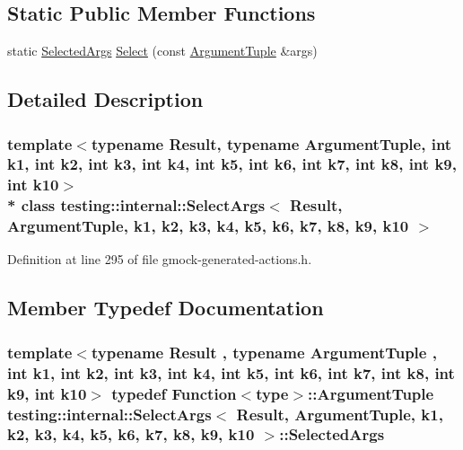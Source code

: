 \subsection*{Static Public Member Functions}
\begin{DoxyCompactItemize}
\item 
static \hyperlink{classtesting_1_1internal_1_1_select_args_ad1eaa794653b3f4cefdb5c2285b418a7}{Selected\+Args} \hyperlink{classtesting_1_1internal_1_1_select_args_a372c597a96263b29d59fdb08183bc2e1}{Select} (const \hyperlink{typedefs__d_8js_a396b2bdc7ef45f482a7e9254b15c3c01}{Argument\+Tuple} \&args)
\end{DoxyCompactItemize}


\subsection{Detailed Description}
\subsubsection*{template$<$typename Result, typename Argument\+Tuple, int k1, int k2, int k3, int k4, int k5, int k6, int k7, int k8, int k9, int k10$>$\\*
class testing\+::internal\+::\+Select\+Args$<$ Result, Argument\+Tuple, k1, k2, k3, k4, k5, k6, k7, k8, k9, k10 $>$}



Definition at line 295 of file gmock-\/generated-\/actions.\+h.



\subsection{Member Typedef Documentation}
\subsubsection[{\texorpdfstring{Selected\+Args}{SelectedArgs}}]{\setlength{\rightskip}{0pt plus 5cm}template$<$typename Result , typename Argument\+Tuple , int k1, int k2, int k3, int k4, int k5, int k6, int k7, int k8, int k9, int k10$>$ typedef {\bf Function}$<${\bf type}$>$\+::{\bf Argument\+Tuple} {\bf testing\+::internal\+::\+Select\+Args}$<$ {\bf Result}, {\bf Argument\+Tuple}, k1, k2, k3, k4, k5, k6, k7, k8, k9, k10 $>$\+::{\bf Selected\+Args}}\hypertarget{classtesting_1_1internal_1_1_select_args_ad1eaa794653b3f4cefdb5c2285b418a7}{}\label{classtesting_1_1internal_1_1_select_args_ad1eaa794653b3f4cefdb5c2285b418a7}


